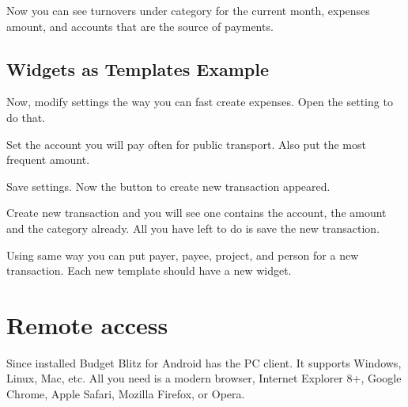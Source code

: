 \documentclass[a4paper,10pt,english]{sphinxmanual}
\begin{document}
Now you can see turnovers under  category for the current month,
expenses amount, and accounts that are the source of payments.


\section{Widgets as Templates Example}
\label{\detokenize{widgets:widgets-as-templates-example}}
Now, modify settings the way you can fast create expenses. Open the setting to do that.

\noindent{}

\noindent{}

\noindent{}

Set the account you will pay often for public transport. Also put the most frequent amount.

\noindent{}

\noindent{}

\noindent{}

Save settings. Now the button to create new transaction appeared.

\noindent{}

Create new transaction and you will see one contains the account, the amount and the category already.
All you have left to do is save the new transaction.

Using same way you can put payer, payee, project, and person for a new transaction. Each new
template should have a new widget.


\chapter{Remote access}
\label{\detokenize{remote-access:remote-access}}\label{\detokenize{remote-access:chapter-remote-access}}\label{\detokenize{remote-access::doc}}
Since installed Budget Blitz for Android has the PC client. It supports Windows, Linux, Mac, etc. All you need is
a modern browser, Internet Explorer 8+, Google Chrome, Apple Safari, Mozilla Firefox, or Opera.
\end{document}
